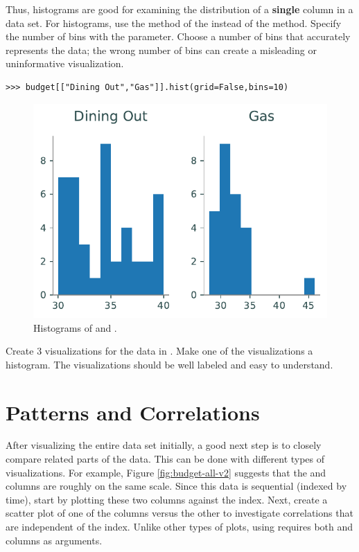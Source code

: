Thus, histograms are good for examining the distribution of a \textbf{single} column in a data set.
For histograms, use the  method of the  instead of the  method.
Specify the number of bins with the  parameter.
Choose a number of bins that accurately represents the data; the wrong number of bins can create a misleading or uninformative visualization.


\begin{lstlisting}
>>> budget[["Dining Out","Gas"]].hist(grid=False,bins=10)
\end{lstlisting}

\begin{figure}[H]
    \includegraphics[width=.7\textwidth]{figures/hist_subplots.pdf}
   \caption{Histograms of  and .}
\end{figure}

\begin{problem}
Create 3 visualizations for the data in .
Make one of the visualizations a histogram.
The visualizations should be well labeled and easy to understand.
\label{prob:hist}
\end{problem}

\section*{Patterns and Correlations} %

After visualizing the entire data set initially, a good next step is to closely compare related parts of the data.
This can be done with different types of visualizations.
For example, Figure \ref{fig:budget-all-v2} suggests that the  and  columns are roughly on the same scale.
Since this data is sequential (indexed by time), start by plotting these two columns against the index.
Next, create a scatter plot of one of the columns versus the other to investigate correlations that are independent of the index.
Unlike other types of plots, using  requires both  and  columns as arguments.

